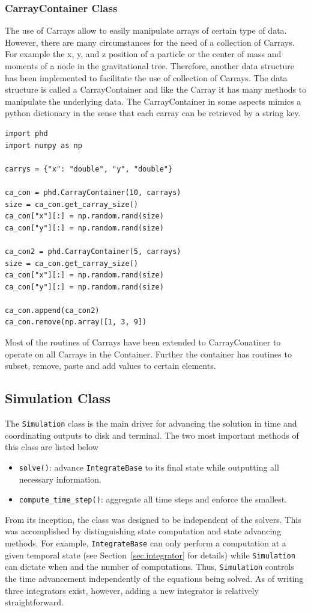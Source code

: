 \subsubsection{CarrayContainer Class}
\label{sec.carraycontainer}
The use of Carrays allow to easily manipulate arrays of certain type of data. However, there are
many circumstances for the need of a collection of Carrays. For example the x, y, and z position
of a particle or the center of mass and moments of a node in the gravitational tree. Therefore,
another data structure has been implemented to facilitate the use of collection of Carrays. The data
structure is called a CarrayContainer and like the Carray it has many methods to manipulate the
underlying data. The CarrayContainer in some aspects mimics a python dictionary in the sense
that each carray can be retrieved by a string key.
\begin{lstlisting}
import phd
import numpy as np

carrys = {"x": "double", "y", "double"}

ca_con = phd.CarrayContainer(10, carrays)
size = ca_con.get_carray_size()
ca_con["x"][:] = np.random.rand(size)
ca_con["y"][:] = np.random.rand(size)

ca_con2 = phd.CarrayContainer(5, carrays)
size = ca_con.get_carray_size()
ca_con["x"][:] = np.random.rand(size)
ca_con["y"][:] = np.random.rand(size)

ca_con.append(ca_con2)
ca_con.remove(np.array([1, 3, 9])
\end{lstlisting}
Most of the routines of Carrays have been extended to CarrayConatiner to operate on
all Carrays in the Container. Further the container has routines to subset, remove, paste
and add values to certain elements.

\subsection{Simulation Class}
The \lstinline{Simulation} class is the main driver for advancing the solution in time
and coordinating outputs to disk and terminal. The two most important methods of this
class are listed below
\begin{itemize}
    \item \lstinline{solve()}: advance \lstinline{IntegrateBase} to its final state while
        outputting all necessary information. 
    \item \lstinline{compute_time_step()}: aggregate all time steps and enforce the smallest.
\end{itemize}
From its inception, the class was designed to be independent of the solvers. This was 
accomplished by distinguishing state computation and state advancing methods. For example,
\lstinline{IntegrateBase} can only perform a computation at a given temporal state 
(see Section~\ref{sec.integrator} for details) while \lstinline{Simulation} can
dictate when and the number of computations. Thus, \lstinline{Simulation} controls the
time advancement independently of the equations being solved. As of writing three integrators
exist, however, adding a new integrator is relatively straightforward.

